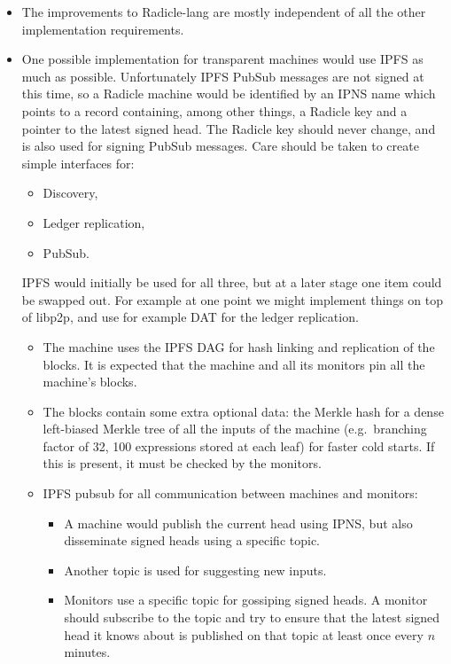 \documentclass[a4paper, oneside, 10pt]{amsart}
\begin{document}
\begin{itemize}
\item
  The improvements to Radicle-lang are mostly independent of all the other
  implementation requirements.
\item
  One possible implementation for transparent machines would use IPFS as much as
  possible. Unfortunately IPFS PubSub messages are not signed at this time, so a
  Radicle machine would be identified by an IPNS name which points to a record
  containing, among other things, a Radicle key and a pointer to the latest
  signed head. The Radicle key should never change, and is also used for signing
  PubSub messages. Care should be taken to create simple interfaces for:
  \begin{itemize}
  \item Discovery,
  \item Ledger replication,
  \item PubSub.
  \end{itemize}
  IPFS would initially be used for all three, but at a later stage one item
  could be swapped out. For example at one point we might implement things on
  top of libp2p, and use for example DAT for the ledger replication.
  \begin{itemize}
  \item
    The machine uses the IPFS DAG for hash linking and replication of the
    blocks. It is expected that the machine and all its monitors pin all the
    machine's blocks.
  \item
    The blocks contain some extra optional data: the Merkle hash for a dense
    left-biased Merkle tree of all the inputs of the machine (e.g.~branching
    factor of 32, 100 expressions stored at each leaf) for faster cold
    starts. If this is present, it must be checked by the monitors.
  \item
    IPFS pubsub for all communication between machines and monitors:
    \begin{itemize}
    \item
      A machine would publish the current head using IPNS, but also disseminate
      signed heads using a specific topic.
    \item
      Another topic is used for suggesting new inputs.
    \item
      Monitors use a specific topic for gossiping signed heads. A monitor should
      subscribe to the topic and try to ensure that the latest signed head it
      knows about is published on that topic at least once every $n$ minutes.

\end{itemize}
\end{itemize}
\end{itemize}
\end{document}
